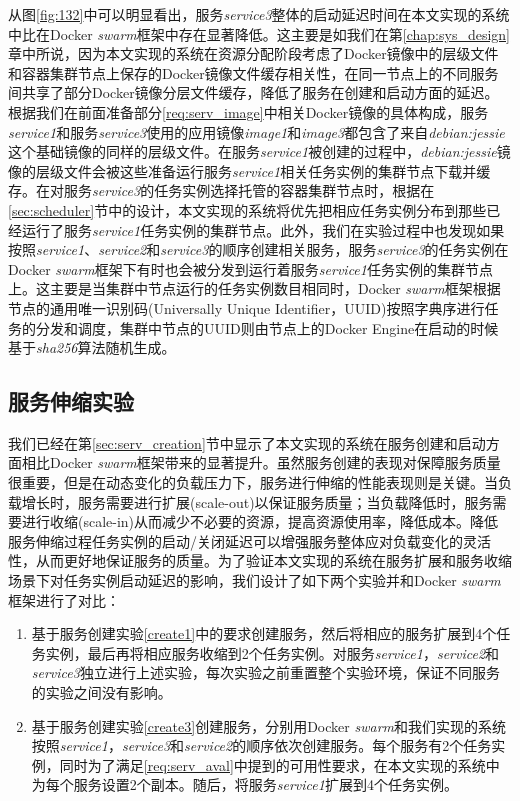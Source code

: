 从图\ref{fig:132}中可以明显看出，服务\emph{service3}整体的启动延迟时间在本文实现的系统中比在Docker \emph{swarm}框架中存在显著降低。这主要是如我们在第\ref{chap:sys_design}章中所说，因为本文实现的系统在资源分配阶段考虑了Docker镜像中的层级文件和容器集群节点上保存的Docker镜像文件缓存相关性，在同一节点上的不同服务间共享了部分Docker镜像分层文件缓存，降低了服务在创建和启动方面的延迟。根据我们在前面准备部分\ref{req:serv_image}中相关Docker镜像的具体构成，服务\emph{service1}和服务\emph{service3}使用的应用镜像\emph{image1}和\emph{image3}都包含了来自\emph{debian:jessie}这个基础镜像的同样的层级文件。在服务\emph{service1}被创建的过程中，\emph{debian:jessie}镜像的层级文件会被这些准备运行服务\emph{service1}相关任务实例的集群节点下载并缓存。在对服务\emph{service3}的任务实例选择托管的容器集群节点时，根据在\ref{sec:scheduler}节中的设计，本文实现的系统将优先把相应任务实例分布到那些已经运行了服务\emph{service1}任务实例的集群节点。此外，我们在实验过程中也发现如果按照\emph{service1}、\emph{service2}和\emph{service3}的顺序创建相关服务，服务\emph{service3}的任务实例在Docker \emph{swarm}框架下有时也会被分发到运行着服务\emph{service1}任务实例的集群节点上。这主要是当集群中节点运行的任务实例数目相同时，Docker \emph{swarm}框架根据节点的通用唯一识别码(Universally Unique Identifier，UUID)按照字典序进行任务的分发和调度，集群中节点的UUID则由节点上的Docker Engine在启动的时候基于\emph{sha256}算法随机生成。

\subsection{服务伸缩实验}\label{sec:serv_scale}
我们已经在第\ref{sec:serv_creation}节中显示了本文实现的系统在服务创建和启动方面相比Docker \emph{swarm}框架带来的显著提升。虽然服务创建的表现对保障服务质量很重要，但是在动态变化的负载压力下，服务进行伸缩的性能表现则是关键。当负载增长时，服务需要进行扩展(scale-out)以保证服务质量；当负载降低时，服务需要进行收缩(scale-in)从而减少不必要的资源，提高资源使用率，降低成本。降低服务伸缩过程任务实例的启动/关闭延迟可以增强服务整体应对负载变化的灵活性，从而更好地保证服务的质量。为了验证本文实现的系统在服务扩展和服务收缩场景下对任务实例启动延迟的影响，我们设计了如下两个实验并和Docker \emph{swarm}框架进行了对比：
\begin{enumerate}
\item\label{scale1} 基于服务创建实验\ref{create1}中的要求创建服务，然后将相应的服务扩展到4个任务实例，最后再将相应服务收缩到2个任务实例。对服务\emph{service1}，\emph{service2}和\emph{service3}独立进行上述实验，每次实验之前重置整个实验环境，保证不同服务的实验之间没有影响。
\item\label{scale2} 基于服务创建实验\ref{create3}创建服务，分别用Docker \emph{swarm}和我们实现的系统按照\emph{service1}，\emph{service3}和\emph{service2}的顺序依次创建服务。每个服务有2个任务实例，同时为了满足\ref{req:serv_aval}中提到的可用性要求，在本文实现的系统中为每个服务设置2个副本。随后，将服务\emph{service1}扩展到4个任务实例。
\end{enumerate}

